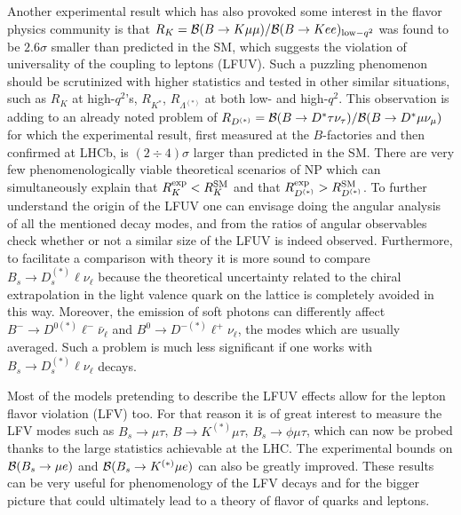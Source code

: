Another experimental result which has also provoked some interest in the flavor physics community is that $R_K = {\cal B}(B\rightarrow K\mu\mu)/{\cal B}(B\rightarrow Kee)_{{\rm low}-q^2}$ was found to be $2.6\sigma$ smaller than  predicted in the SM, which suggests the violation of universality of the coupling to leptons (LFUV). Such a puzzling phenomenon should be scrutinized with higher statistics and tested in other similar situations, 
such as $R_K$ at high-$q^2$'s, $R_{K^\ast}$, $R_{\Lambda^{(\ast )}}$ at both low- and high-$q^2$. This observation is adding to an already noted problem of $R_{D^{(\ast)}}=  {\cal B}(B\rightarrow D^{\ast}\tau\nu_\tau)/{\cal B}(B\rightarrow D^{\ast}\mu\nu_\mu)$ for which the experimental result, first measured at the $B$-factories and then confirmed at LHCb, is $(2\div 4)\sigma$ larger than predicted in the SM. There are very few phenomenologically viable theoretical scenarios of NP which can simultaneously explain that $R_K^{\rm exp}<R_K^{\rm SM}$ and that $R_{D^{(\ast )}}^{\rm exp} > R_{D^{(\ast )}}^{\rm SM}$. To further understand the origin of the LFUV one can envisage doing the angular analysis of all the mentioned decay modes, and from the ratios of angular observables check whether or not a similar size of the LFUV is indeed observed. 
Furthermore, to facilitate a comparison with theory it is more sound to compare $B_s\to D_s^{(\ast)}\ell \nu_\ell$ because the theoretical uncertainty related to the chiral extrapolation in the light valence quark on the lattice is completely avoided in this way. Moreover, the emission of soft photons can differently affect $B^- \to D^{0 (\ast)}\ell^- \bar \nu_\ell$ and $B^0 \to D^{- (\ast)}\ell^+ \nu_\ell$, the modes which are usually averaged. Such a problem is much less significant if one works with $B_s\to D_s^{(\ast)}\ell \nu_\ell$ decays. 

Most of the models pretending to describe the LFUV effects allow for the lepton flavor violation (LFV) too. For that reason it is of great interest to measure the LFV modes such as $B_s\to \mu \tau$, $B\to K^{(\ast )}\mu \tau$,  $B_s\to \phi \mu \tau$, which can now be probed thanks to the large statistics achievable at the LHC. The experimental bounds on ${\cal B}(B_s\rightarrow \mu e)$ and ${\cal B}(B_s\rightarrow K^{(\ast )} \mu e)$ can also be greatly improved. These results can be very useful for phenomenology of the LFV decays and for the bigger picture that could ultimately lead to a theory of flavor of quarks and leptons. 

